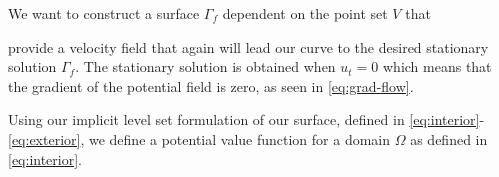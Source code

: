 \begin{proposition}
We want to construct a surface $\Gamma_f$ dependent on the point set $V$ that 
\end{proposition}

provide a velocity field that again will lead our curve to the desired stationary solution $\Gamma_f$. The stationary solution is obtained when $u_t = 0$ which means that the gradient of the potential field is zero, as seen in \eqref{eq:grad-flow}. 

Using our implicit level set formulation of our surface, defined in \eqref{eq:interior}-\eqref{eq:exterior}, we define a potential value function for a domain $\Omega$ as defined in \eqref{eq:interior}. 

